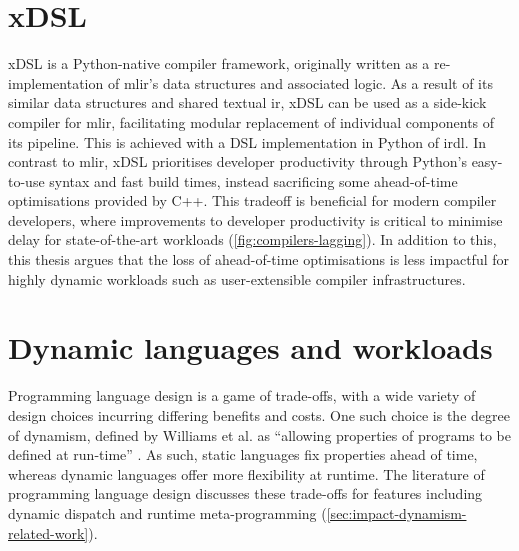 
\section{xDSL}
\label{sec:xdsl}

xDSL is a Python-native compiler framework, originally written as a re-implementation of \ac{mlir}'s data structures and associated logic.
As a result of its similar data structures and shared textual \ac{ir}, xDSL can be used as a side-kick compiler for \ac{mlir}, facilitating modular replacement of individual components of its pipeline. This is achieved with a DSL implementation in Python of \ac{irdl}.
In contrast to \ac{mlir}, xDSL prioritises developer productivity through Python's easy-to-use syntax and fast build times, instead sacrificing some ahead-of-time optimisations provided by C++.
This tradeoff is beneficial for modern compiler developers, where improvements to developer productivity is critical to minimise delay for state-of-the-art workloads (\autoref{fig:compilers-lagging}). In addition to this, this thesis argues that the loss of ahead-of-time optimisations is less impactful for highly dynamic workloads such as user-extensible compiler infrastructures.



\section{Dynamic languages and workloads}
\label{sec:static-dynamic-languages}

Programming language design is a game of trade-offs, with a wide variety of design choices incurring differing benefits and costs.
One such choice is the degree of dynamism, defined by Williams et al. as ``allowing properties of programs to be defined at run-time'' \cite{williamsDynamicInterpretationDynamic2010}. As such, static languages fix properties ahead of time, whereas dynamic languages offer more flexibility at runtime.
The literature of programming language design discusses these trade-offs for features including dynamic dispatch and runtime meta-programming (\autoref{sec:impact-dynamism-related-work}).

